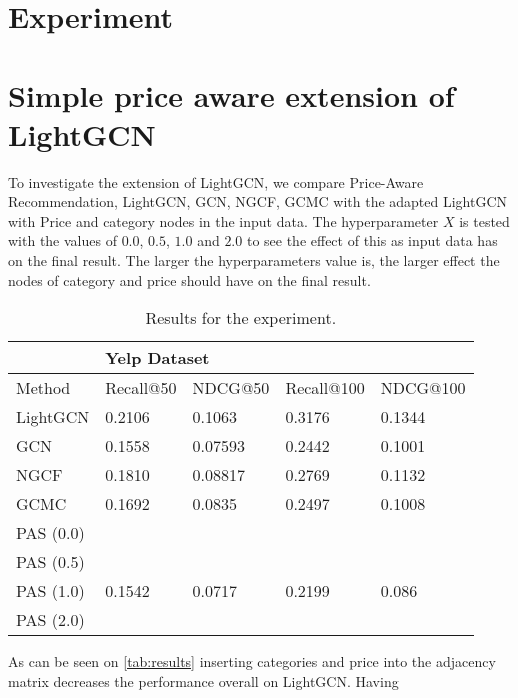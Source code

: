 \section{Experiment}

\section{Simple price aware extension of LightGCN}
To investigate the extension of LightGCN, we compare Price-Aware Recommendation, LightGCN, GCN, NGCF, GCMC with the adapted LightGCN with Price and category nodes in the input data.
The hyperparameter $X$ is tested with the values of $0.0$, $0.5$, $1.0$ and $2.0$ to see the effect of this as input data has on the final result.
The larger the hyperparameters value is, the larger effect the nodes of category and price should have on the final result.
\begin{table*}[h!]
    \centering
    \begin{tabular}{|l|l|l|l|l|}
        \hline
        \rowcolor[HTML]{FFFFFF}
                  & \multicolumn{4}{l|}{\cellcolor[HTML]{FFFFFF}Yelp Dataset}                                   \\ \hline
        Method    & Recall@50                                                 & NDCG@50 & Recall@100 & NDCG@100 \\ \hline
        LightGCN  & 0.2106                                                    & 0.1063  & 0.3176     & 0.1344   \\ \hline
        GCN       & 0.1558                                                    & 0.07593 & 0.2442     & 0.1001   \\ \hline
        NGCF      & 0.1810                                                    & 0.08817 & 0.2769     & 0.1132   \\ \hline
        GCMC      & 0.1692                                                    & 0.0835  & 0.2497     & 0.1008   \\ \hline
        PAS (0.0) &                                                           &         &            &          \\ \hline
        PAS (0.5) &                                                           &         &            &          \\ \hline
        PAS (1.0) & 0.1542                                                    & 0.0717  & 0.2199     & 0.086    \\ \hline
        PAS (2.0) &                                                           &         &            &          \\ \hline
    \end{tabular}
    \caption{Results for the experiment.}
    \label{tab:results}
\end{table*}
As can be seen on \autoref{tab:results} inserting categories and price into the adjacency matrix decreases the performance overall on LightGCN.
Having
